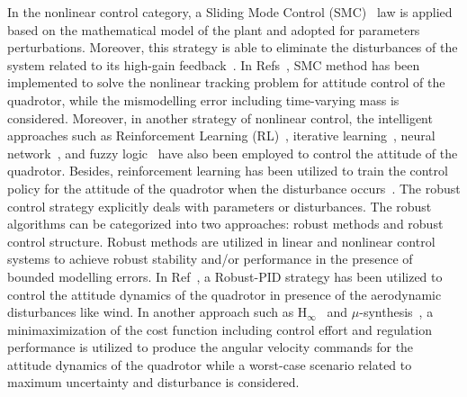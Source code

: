 \documentclass[3p]{elsarticle}
\begin{document}
In the nonlinear control category, a Sliding Mode Control (SMC)~\cite{LABBADI2020290, MOFID2022455} law is applied based on the mathematical model of the plant and adopted for parameters perturbations. Moreover, this strategy is able to eliminate the disturbances of the system related to its high-gain feedback~\cite{YANG2021175}. In Refs~\cite{WU2022436}, SMC method has been implemented to solve the nonlinear tracking problem for attitude control of the quadrotor, while the mismodelling error including time-varying mass is considered. Moreover, in another strategy of nonlinear control, the intelligent approaches such as Reinforcement Learning (RL)~\cite{Hwangbo_2017, LIN2020135}, iterative learning~\cite{electronics10202474}, neural network~\cite{JIN202012241}, and fuzzy logic~\cite{GLIDA2022} have also been employed to control the attitude of the quadrotor. Besides, reinforcement learning has been utilized to train the control policy for the attitude of the quadrotor when the disturbance occurs~\cite{WANG2023222}.
The robust control strategy explicitly deals with parameters or disturbances. The robust algorithms can be categorized into two approaches: robust methods and robust control structure. Robust methods are utilized in linear and nonlinear control systems to achieve robust stability and/or performance in the presence of bounded modelling errors. In Ref~\cite{MIRANDACOLORADO202047}, a Robust-PID strategy has been utilized to control the attitude dynamics of the quadrotor in presence of the aerodynamic disturbances like wind. In another approach such as H$_{\infty}$~\cite{WANG201910, REKABI202081} and $\mu$-synthesis~\cite{RODRIGUEZMARTINEZ2023739}, a minimaximization of the cost function including control effort and regulation performance is utilized to produce the angular velocity commands for the attitude dynamics of the quadrotor while a worst-case scenario related to maximum uncertainty and disturbance is considered. 
\end{document}
